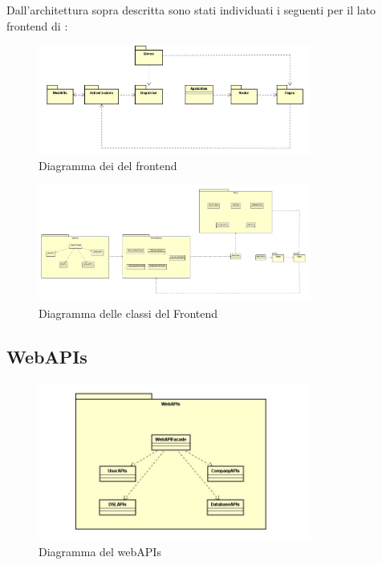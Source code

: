 Dall'architettura sopra descritta sono stati individuati i seguenti  per il lato frontend di :

\begin{figure}[h]
\centering
\includegraphics[width=0.8\textwidth]{res/sections/imgs/packages-diagram.jpg}
\caption{Diagramma dei  del frontend}
\end{figure}

\begin{figure}[h]
\centering
\includegraphics[width=0.8\textwidth]{res/sections/frontend/fullFrontend.jpg}
\caption{Diagramma delle classi del Frontend}
\end{figure}

\subsection{WebAPIs}

\begin{figure}[h]
\centering
\includegraphics[width=0.8\textwidth]{res/sections/imgs/webapi-diagram.jpg}
\caption{Diagramma del  webAPIs}
\end{figure}

